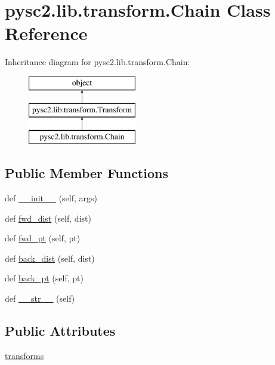 \hypertarget{classpysc2_1_1lib_1_1transform_1_1_chain}{}\section{pysc2.\+lib.\+transform.\+Chain Class Reference}
\label{classpysc2_1_1lib_1_1transform_1_1_chain}
Inheritance diagram for pysc2.\+lib.\+transform.\+Chain\+:\begin{figure}[H]
\begin{center}
\leavevmode
\includegraphics[height=3.000000cm]{classpysc2_1_1lib_1_1transform_1_1_chain}
\end{center}
\end{figure}
\subsection*{Public Member Functions}
\begin{DoxyCompactItemize}
\item 
def \mbox{\hyperlink{classpysc2_1_1lib_1_1transform_1_1_chain_a1d57ca10d7be4c654ce06576bbb4ad18}{\+\_\+\+\_\+init\+\_\+\+\_\+}} (self, args)
\item 
def \mbox{\hyperlink{classpysc2_1_1lib_1_1transform_1_1_chain_a25df9664f373ccc03b5b10a8f377403f}{fwd\+\_\+dist}} (self, dist)
\item 
def \mbox{\hyperlink{classpysc2_1_1lib_1_1transform_1_1_chain_a5f3eaf18a7e2894fe6cda71aa2494f90}{fwd\+\_\+pt}} (self, pt)
\item 
def \mbox{\hyperlink{classpysc2_1_1lib_1_1transform_1_1_chain_aba80172f3b617b23cf5b77157d9eec39}{back\+\_\+dist}} (self, dist)
\item 
def \mbox{\hyperlink{classpysc2_1_1lib_1_1transform_1_1_chain_a120a678dc48fe4c20793c451a6e97ee1}{back\+\_\+pt}} (self, pt)
\item 
def \mbox{\hyperlink{classpysc2_1_1lib_1_1transform_1_1_chain_ab85b58ce2f473803c1e19ff01efc2dcb}{\+\_\+\+\_\+str\+\_\+\+\_\+}} (self)
\end{DoxyCompactItemize}
\subsection*{Public Attributes}
\begin{DoxyCompactItemize}
\item 
\mbox{\hyperlink{classpysc2_1_1lib_1_1transform_1_1_chain_a445a392e9d972836f6ec6d3b43018192}{transforms}}
\end{DoxyCompactItemize}


